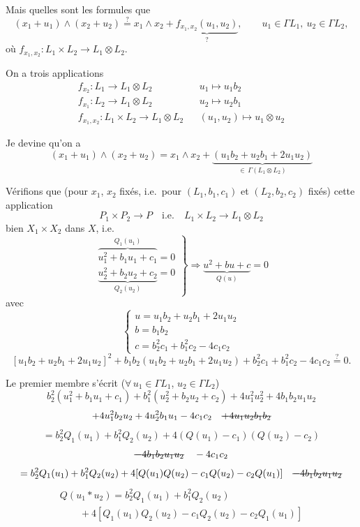\documentclass[11pt,a4paper]{article}
\begin{document}
Mais quelles sont les formules que
\[
  (x_1+u_1) \wedge (x_2+u_2) \overset{?}{=} x_1 \wedge x_2 + \underbrace{f_{x_1,x_2}(u_1,u_2)}_{?},
  \qquad u_1 \in \Gamma L_1,\ u_2 \in \Gamma L_2,
\]
où $f_{x_1,x_2} : L_1 \times L_2 \to L_1 \otimes L_2$.

On a trois applications \struck{\ill{}}
\[
  \begin{array}{lll}
  f_{x_2} : L_1 \to L_1 \otimes L_2 & & u_1 \mapsto u_1 b_2 \\
  f_{x_1} : L_2 \to L_1 \otimes L_2 & & u_2 \mapsto u_2 b_1 \\
  f_{x_1,x_2} : L_1 \times L_2 \to L_1 \otimes L_2 & & (u_1,u_2) \mapsto u_1 \otimes u_2
  \end{array}
\]

Je devine qu'on a
\[
  \boxed{(x_1+u_1) \wedge (x_2+u_2) = x_1 \wedge x_2
  + \underbrace{(u_1b_2 + u_2b_1 + 2u_1u_2)}_{\in\, \Gamma(L_1 \otimes L_2)}}
\]

Vérifions que (pour $x_1$, $x_2$ fixés, i.e.\ pour $(L_1, b_1, c_1)$ et $(L_2, b_2, c_2)$ fixés) cette application
\[
  P_1 \times P_2 \to P \quad \text{i.e.} \quad L_1 \times L_2 \to L_1 \otimes L_2
\]
 bien $X_1 \times X_2$ dans $X$, i.e.
\[
  \left.\begin{array}{l}
  \overbrace{u_1^2 + b_1u_1 + c_1}^{Q_1(u_1)} = 0 \\
  \underbrace{u_2^2 + b_2u_2 + c_2}_{Q_2(u_2)} = 0
  \end{array}\right\}
  \Longrightarrow
  \underbrace{u^2 + bu + c}_{Q(u)} = 0
\]
avec
\[
  \left\{\begin{array}{l}
  u = u_1b_2 + u_2b_1 + 2u_1u_2 \\
  b = b_1b_2 \\
  c = b_2^2 c_1 + b_1^2 c_2 - 4c_1c_2
  \end{array}\right.
\]
\[
  [u_1b_2 + u_2b_1 + 2u_1u_2]^2 + b_1b_2(u_1b_2 + u_2b_1 + 2u_1u_2)
  + b_2^2c_1 + b_1^2c_2 - 4c_1c_2 \overset{?}{=} 0 .
\]

Le premier membre s'écrit ($\forall\, u_1 \in \Gamma L_1$, $u_2 \in \Gamma L_2$)
\[
  b_2^2(u_1^2 + b_1u_1 + c_1) + b_1^2(u_2^2 + b_2u_2 + c_2) + 4u_1^2u_2^2
  + 4b_1b_2u_1u_2
\]
\[
  + 4u_1^2b_2u_2 + 4u_2^2b_1u_1 - 4c_1c_2
  \quad \text{\struck{$+ 4u_1u_2b_1b_2$}}
\]
\[
  = b_2^2 Q_1(u_1) + b_1^2 Q_2(u_2) + 4(Q(u_1) - c_1)(Q(u_2) - c_2)
\]
\[
  \text{\struck{$- 4b_1b_2u_1u_2$}} \quad - 4c_1c_2
\]
\[
  = b_2^2 Q_1(u_1) + b_1^2 Q_2(u_2)
  + 4[Q(u_1)Q(u_2) - c_1Q(u_2) - c_2Q(u_1)]
  \quad \text{\struck{$-4b_1b_2u_1u_2$}}
\]
\[
  \boxed{\begin{array}{l}
  Q(u_1 * u_2) = b_2^2 Q_1(u_1) + b_1^2 Q_2(u_2) \\
  \qquad + 4[Q_1(u_1)Q_2(u_2) - c_1Q_2(u_2) - c_2Q_1(u_1)]
  \end{array}}
\]
\end{document}
